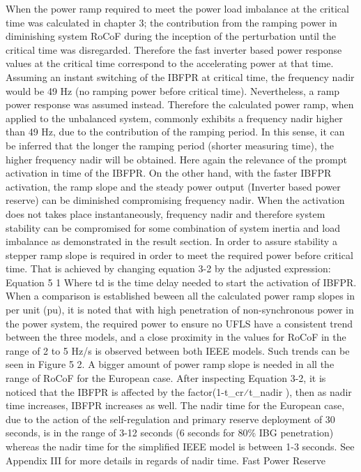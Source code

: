 When the power ramp required to meet the power load imbalance at the critical time was calculated in chapter 3; the contribution from the ramping power in diminishing system RoCoF during the inception of the perturbation until the critical time was disregarded. Therefore the fast inverter based power response values at the critical time correspond to the accelerating power at that time. Assuming an instant switching of the IBFPR at critical time, the frequency nadir would be 49 Hz (no ramping power before critical time). Nevertheless, a ramp power response was assumed instead. Therefore the calculated power ramp, when applied to the unbalanced system, commonly exhibits a frequency nadir higher than 49 Hz, due to the contribution of the ramping period. In this sense, it can be inferred that the longer the ramping period (shorter measuring time), the higher frequency nadir will be obtained. Here again the relevance of the prompt activation in time of the IBFPR. On the other hand, with the faster IBFPR activation, the ramp slope and the steady power output (Inverter based power reserve) can be diminished compromising frequency nadir.
When the activation does not takes place instantaneously, frequency nadir and therefore system stability can be compromised for some combination of system inertia and load imbalance as demonstrated in the result section. In order to assure stability a stepper ramp slope is required in order to meet the required power before critical time. That is achieved by changing equation 3-2 by the adjusted expression:
Equation 5 1
Where td is the time delay needed to start the activation of IBFPR.
When a comparison is established beween all the calculated power ramp slopes in per unit  (pu), it is noted that with high penetration of non-synchronous power in the power system, the required power to ensure no UFLS have a consistent trend between the three models, and a close proximity in the values for RoCoF in the range of 2 to 5 Hz/s is observed between both IEEE models. Such trends can be seen in Figure 5 2.
A bigger amount of power ramp slope is needed in all the range of RoCoF for the European case. After inspecting Equation 3-2, it is noticed that the IBFPR is affected by the factor(1-t_cr⁄t_nadir ), then as nadir time increases, IBFPR increases as well. The nadir time for the European case, due to the action of the self-regulation and primary reserve deployment of 30 seconds, is in the range of 3-12 seconds (6 seconds for 80\% IBG penetration) whereas the nadir time for the simplified IEEE model is between 1-3 seconds. See Appendix III for more details in regards of nadir time.
Fast Power Reserve

